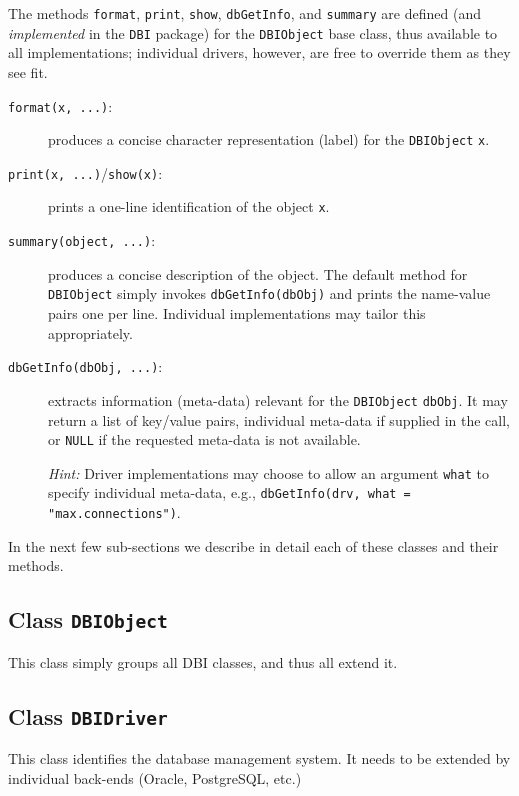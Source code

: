 \documentclass[graphics,times,psfig,dvips,hyper]{article}
\newcommand{\sobj}[1]{\mbox{\tt #1}}    %
\newcommand{\sexp}[1]{\mbox{\tt #1}}    %
\newcommand{\sclass}[1]{\mbox{\tt #1}}  %
\newcommand{\smethod}[1]{\mbox{\tt #1}} %
\begin{document}
The methods \smethod{format}, \smethod{print}, \smethod{show}, 
\smethod{dbGetInfo}, and \smethod{summary}
are defined (and \emph{implemented} in the \sobj{DBI} package) 
for the \sclass{DBIObject} base class, thus available to all 
implementations; individual drivers, however, are free to override 
them as they see fit.
\begin{description} 
\item[\smethod{format(x, ...)}:]
   produces a concise character representation (label) for the
   \sclass{DBIObject} \sobj{x}.

\item[\smethod{print(x, ...)}/\smethod{show(x)}:]
  prints a one-line identification of the object \sobj{x}.

\item[\smethod{summary(object, ...)}:]
  produces a concise description of the object.
  The default method for \sclass{DBIObject} simply 
  invokes \sexp{dbGetInfo(dbObj)} and prints the name-value
  pairs one per line.  Individual implementations may tailor
  this appropriately.

\item[\smethod{dbGetInfo(dbObj, ...)}:]
  extracts information (meta-data) relevant for the
  \sclass{DBIObject} \sobj{dbObj}.  It may return a list
  of key/value pairs, individual meta-data if supplied
  in the call, or \sobj{NULL} if the requested meta-data
  is not available.

  \emph{Hint:} Driver implementations may choose to allow an 
  argument \sobj{what} to specify individual meta-data,  e.g., 
  \sexp{dbGetInfo(drv, what = "max.connections")}.

\end{description}

In the next few sub-sections we describe in detail each of these
classes and their methods.

\subsection{Class \sclass{DBIObject}}\label{sec:DBIObject}
This class simply groups all DBI classes, and thus all extend it.

\subsection{Class \sclass{DBIDriver}}\label{sec:DBIDriver}
This class identifies the database management system. It needs to 
be extended by individual back-ends (Oracle, PostgreSQL, etc.)
\end{document}
